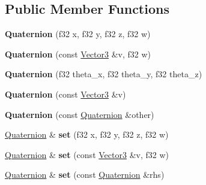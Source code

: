 \subsection*{Public Member Functions}
\begin{DoxyCompactItemize}
\item 
{\bfseries Quaternion} (f32 x, f32 y, f32 z, f32 w)\hypertarget{classDE_1_1Quaternion_a46fdded1aa5d3e869d3d72e07586890c}{}\label{classDE_1_1Quaternion_a46fdded1aa5d3e869d3d72e07586890c}

\item 
{\bfseries Quaternion} (const \hyperlink{classDE_1_1Vector3}{Vector3} \&v, f32 w)\hypertarget{classDE_1_1Quaternion_a8e2c0a32e74e099eaf8e7f468513ccad}{}\label{classDE_1_1Quaternion_a8e2c0a32e74e099eaf8e7f468513ccad}

\item 
{\bfseries Quaternion} (f32 theta\+\_\+x, f32 theta\+\_\+y, f32 theta\+\_\+z)\hypertarget{classDE_1_1Quaternion_a16ca7374edb7f228a9f2d641da614b4c}{}\label{classDE_1_1Quaternion_a16ca7374edb7f228a9f2d641da614b4c}

\item 
{\bfseries Quaternion} (const \hyperlink{classDE_1_1Vector3}{Vector3} \&v)\hypertarget{classDE_1_1Quaternion_a71d7271ec4982e0ef4b35cde0ef538ce}{}\label{classDE_1_1Quaternion_a71d7271ec4982e0ef4b35cde0ef538ce}

\item 
{\bfseries Quaternion} (const \hyperlink{classDE_1_1Quaternion}{Quaternion} \&other)\hypertarget{classDE_1_1Quaternion_a859e5db839c584aeb7b28a8b799c2041}{}\label{classDE_1_1Quaternion_a859e5db839c584aeb7b28a8b799c2041}

\item 
\hyperlink{classDE_1_1Quaternion}{Quaternion} \& {\bfseries set} (f32 x, f32 y, f32 z, f32 w)\hypertarget{classDE_1_1Quaternion_ac64303fb77f95fa307aa6fffb9536aec}{}\label{classDE_1_1Quaternion_ac64303fb77f95fa307aa6fffb9536aec}

\item 
\hyperlink{classDE_1_1Quaternion}{Quaternion} \& {\bfseries set} (const \hyperlink{classDE_1_1Vector3}{Vector3} \&v, f32 w)\hypertarget{classDE_1_1Quaternion_a43d98814114d82aedabf4dd27fe13184}{}\label{classDE_1_1Quaternion_a43d98814114d82aedabf4dd27fe13184}

\item 
\hyperlink{classDE_1_1Quaternion}{Quaternion} \& {\bfseries set} (const \hyperlink{classDE_1_1Quaternion}{Quaternion} \&rhs)\hypertarget{classDE_1_1Quaternion_ae68c59723bfbd7be5869453716a804c4}{}\label{classDE_1_1Quaternion_ae68c59723bfbd7be5869453716a804c4}


\end{DoxyCompactItemize}
